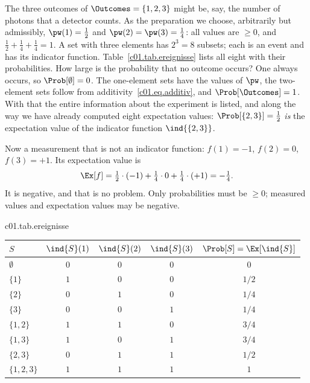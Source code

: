 \begin{example}\label{c01.ex.drei-ergebnisse}
  The three outcomes of $\Outcomes = \{1, 2, 3\}$ might be, say, the number of photons that a
  detector counts. As the preparation we choose, arbitrarily but admissibly,
  $\pw(1) = \tfrac12$ and $\pw(2) = \pw(3) = \tfrac14$: all values are $\geq 0$, and
  $\tfrac12 + \tfrac14 + \tfrac14 = 1$. A set with three elements has $2^3 = 8$ subsets;
  each is an event and has its indicator function. Table~\ref{c01.tab.ereignisse} lists all
  eight with their probabilities. How large is the probability that no outcome occurs? One
  always occurs, so $\Prob[\emptyset] = 0$. The one-element sets have the values of $\pw$,
  the two-element sets follow from additivity~\eqref{c01.eq.additiv}, and
  $\Prob[\Outcomes] = 1$. With that the entire information about the experiment is listed,
  and along the way we have already computed eight expectation values:
  $\Prob[\{2,3\}] = \tfrac12$ \emph{is} the expectation value of the indicator function
  $\ind{\{2,3\}}$.

  Now a measurement that is not an indicator function: $f(1) = -1$, $f(2) = 0$,
  $f(3) = +1$. Its expectation value is
  \begin{equation}\label{c01.eq.drei-ergebnisse}
    \Ex[f] = \tfrac12\cdot(-1) + \tfrac14\cdot 0 + \tfrac14\cdot(+1) = -\tfrac14 .
  \end{equation}
  It is negative, and that is no problem. Only probabilities must be $\geq 0$; measured
  values and expectation values may be negative.
\end{example}

\begin{tpctable}{c01.tab.ereignisse}
  \caption{All eight events of the experiment of Example~\ref{c01.ex.drei-ergebnisse}, with
    the values of their indicator function at the points $1$, $2$, $3$ and their probability
    for $\pw = (\tfrac12, \tfrac14, \tfrac14)$. Every row is a yes-no measurement and its
    expectation value.}
  \begin{tabular}{lcccc}
    \toprule
    $S$ & $\ind{S}(1)$ & $\ind{S}(2)$ & $\ind{S}(3)$ & $\Prob[S] = \Ex[\ind{S}]$ \\
    \midrule
    $\emptyset$ & $0$ & $0$ & $0$ & $0$ \\
    $\{1\}$ & $1$ & $0$ & $0$ & $1/2$ \\
    $\{2\}$ & $0$ & $1$ & $0$ & $1/4$ \\
    $\{3\}$ & $0$ & $0$ & $1$ & $1/4$ \\
    $\{1, 2\}$ & $1$ & $1$ & $0$ & $3/4$ \\
    $\{1, 3\}$ & $1$ & $0$ & $1$ & $3/4$ \\
    $\{2, 3\}$ & $0$ & $1$ & $1$ & $1/2$ \\
    $\{1, 2, 3\}$ & $1$ & $1$ & $1$ & $1$ \\
    \bottomrule
  \end{tabular}
\end{tpctable}

